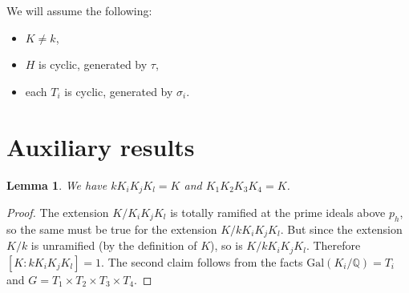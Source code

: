 \documentclass[12pt,a4paper]{article}
\newtheorem{lemma}[theorem]{Lemma}
\newcommand{\Q}{\mathbb{Q}}
\newcommand{\Gal}{\mathrm{Gal}}
\begin{document}
We will assume the following:
\begin{itemize}
\item $K\neq k$,
\item $H$ is cyclic, generated by $\tau$,
\item each $T_i$ is cyclic, generated by $\sigma_i$.
\end{itemize}

\section{Auxiliary results}

\begin{lemma}\label{comp}
We have $kK_iK_jK_l=K$ and $K_1K_2K_3K_4=K$.
\end{lemma}
\begin{proof}
The extension $K/K_iK_jK_l$ is totally ramified at the prime ideals above $p_h$, so the same must be true for the extension $K/kK_iK_jK_l$. But since the extension $K/k$ is unramified (by the definition of $K$), so is $K/kK_iK_jK_l$. Therefore $[K:kK_iK_jK_l]=1$. The second claim follows from the facts $\Gal(K_i/\Q)=T_i$ and $G=T_1\times T_2\times T_3\times T_4$.
\end{proof}
\begin{center}
\end{center}
\end{document}
